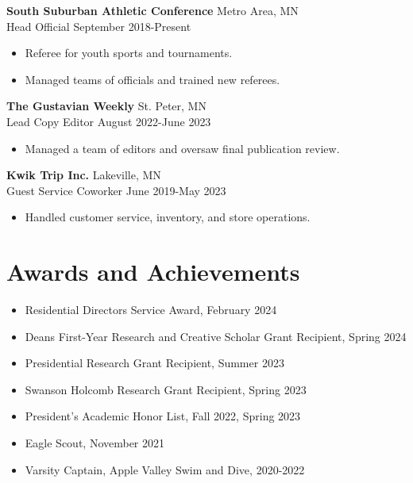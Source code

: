 \documentclass[11pt]{article}
\begin{document}
\textbf{South Suburban Athletic Conference} \hfill Metro Area, MN \\
Head Official \hfill September 2018-Present
\begin{itemize}
    \item Referee for youth sports and tournaments.
    \item Managed teams of officials and trained new referees.
\end{itemize}

\textbf{The Gustavian Weekly} \hfill St. Peter, MN \\
Lead Copy Editor \hfill August 2022-June 2023
\begin{itemize}
    \item Managed a team of editors and oversaw final publication review.
\end{itemize}

\textbf{Kwik Trip Inc.} \hfill Lakeville, MN \\
Guest Service Coworker \hfill June 2019-May 2023
\begin{itemize}
    \item Handled customer service, inventory, and store operations.
\end{itemize}

\vspace{0.1in}

\section*{Awards and Achievements}
\vspace{-0.05in}

\begin{itemize}
    \item Residential Directors Service Award, February 2024
    \item Deans First-Year Research and Creative Scholar Grant Recipient, Spring 2024
    \item Presidential Research Grant Recipient, Summer 2023
    \item Swanson Holcomb Research Grant Recipient, Spring 2023
    \item President’s Academic Honor List, Fall 2022, Spring 2023
    \item Eagle Scout, November 2021
    \item Varsity Captain, Apple Valley Swim and Dive, 2020-2022
\end{itemize}
\end{document}
